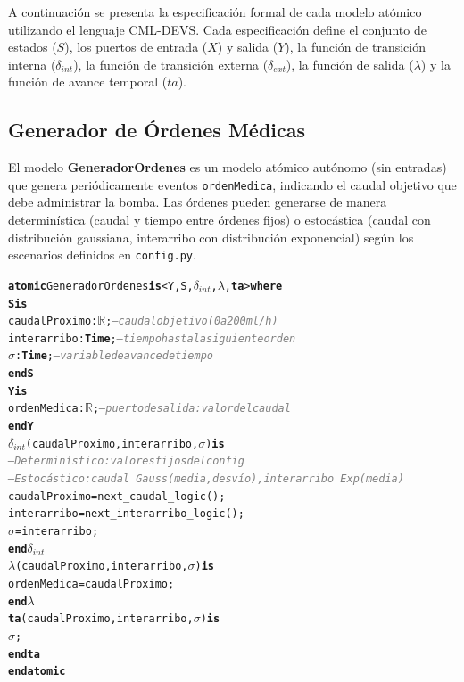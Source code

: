 \documentclass[12pt,a4paper]{article}
\newcommand{\kw}[1]{\textbf{#1}}
\newcommand{\cmlR}{$\mathbb{R}$}
\newcommand{\cmlTime}{\textbf{Time}}
\newcommand{\cmlsigma}{$\sigma$}
\newcommand{\dint}{$\delta_{\mathit{int}}$}
\newcommand{\clambda}{$\lambda$}
\newcommand{\cmlta}{\textbf{ta}}
\newcommand{\cmlcomment}[1]{\textit{\textcolor{gray}{#1}}}
\newenvironment{cmldevs}{%
  \begin{alltt}\small%
}{%
  \end{alltt}%
}
\begin{document}
A continuación se presenta la especificación formal de cada modelo
atómico utilizando el lenguaje CML-DEVS.  Cada
especificación define el conjunto de estados ($S$), los puertos de
entrada ($X$) y salida ($Y$), la función de transición interna
($\delta_{\mathit{int}}$), la función de transición externa
($\delta_{\mathit{ext}}$), la función de salida ($\lambda$) y la
función de avance temporal ($ta$).

\subsection{Generador de Órdenes Médicas}

El modelo \textbf{GeneradorOrdenes} es un modelo atómico autónomo (sin
entradas) que genera periódicamente eventos \texttt{ordenMedica},
indicando el caudal objetivo que debe administrar la bomba.  Las
órdenes pueden generarse de manera determinística (caudal y tiempo
entre órdenes fijos) o estocástica (caudal con distribución gaussiana,
interarribo con distribución exponencial) según los escenarios
definidos en \texttt{config.py}.

\begin{center}
\begin{cmldevs}
\kw{atomic} GeneradorOrdenes \kw{is} <Y, S, \dint{}, \clambda{}, \cmlta{}> \kw{where}
\kw{S is}
    caudalProximo : \cmlR{};    \cmlcomment{-- caudal objetivo (0 a 200 ml/h)}
    interarribo   : \cmlTime{};  \cmlcomment{-- tiempo hasta la siguiente orden}
    \cmlsigma{}             : \cmlTime{};  \cmlcomment{-- variable de avance de tiempo}
\kw{end S}
\kw{Y is}
    ordenMedica : \cmlR{};      \cmlcomment{-- puerto de salida: valor del caudal}
\kw{end Y}
\dint{}(caudalProximo, interarribo, \cmlsigma{}) \kw{is}
    \cmlcomment{-- Determinístico: valores fijos del config}
    \cmlcomment{-- Estocástico: caudal ~ Gauss(media, desvío), interarribo ~ Exp(media)}
    caudalProximo = next\_caudal\_logic();
    interarribo   = next\_interarribo\_logic();
    \cmlsigma{}   = interarribo;
\kw{end} \dint{}
\clambda{}(caudalProximo, interarribo, \cmlsigma{}) \kw{is}
    ordenMedica = caudalProximo;
\kw{end} \clambda{}
\cmlta{}(caudalProximo, interarribo, \cmlsigma{}) \kw{is}
    \cmlsigma{};
\kw{end} \cmlta{}
\kw{end atomic}
\end{cmldevs}
\label{fig:generador-ordenes}
\end{center}
\end{document}
